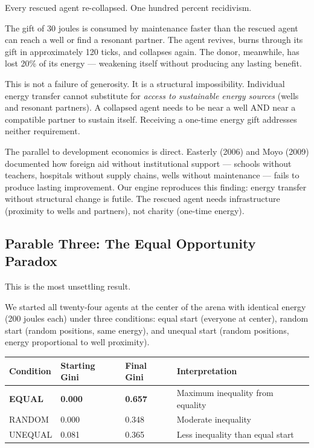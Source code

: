 Every rescued agent re-collapsed. One hundred percent recidivism.

The gift of 30 joules is consumed by maintenance faster than the rescued agent can reach a well or find a resonant partner. The agent revives, burns through its gift in approximately 120 ticks, and collapses again. The donor, meanwhile, has lost 20\% of its energy --- weakening itself without producing any lasting benefit.

This is not a failure of generosity. It is a structural impossibility. Individual energy transfer cannot substitute for \emph{access to sustainable energy sources} (wells and resonant partners). A collapsed agent needs to be near a well AND near a compatible partner to sustain itself. Receiving a one-time energy gift addresses neither requirement.

The parallel to development economics is direct. Easterly (2006) and Moyo (2009) documented how foreign aid without institutional support --- schools without teachers, hospitals without supply chains, wells without maintenance --- fails to produce lasting improvement. Our engine reproduces this finding: energy transfer without structural change is futile. The rescued agent needs infrastructure (proximity to wells and partners), not charity (one-time energy).

\subsection{Parable Three: The Equal Opportunity Paradox}\label{parable-three-the-equal-opportunity-paradox}

This is the most unsettling result.

We started all twenty-four agents at the center of the arena with identical energy (200 joules each) under three conditions: equal start (everyone at center), random start (random positions, same energy), and unequal start (random positions, energy proportional to well proximity).

\begin{longtable}[]{@{}llll@{}}
\toprule\noalign{}
Condition & Starting Gini & Final Gini & Interpretation \\
\midrule\noalign{}
\endhead
\bottomrule\noalign{}
\endlastfoot
\textbf{EQUAL} & \textbf{0.000} & \textbf{0.657} & Maximum inequality from equality \\
RANDOM & 0.000 & 0.348 & Moderate inequality \\
UNEQUAL & 0.081 & 0.365 & Less inequality than equal start \\
\end{longtable}

